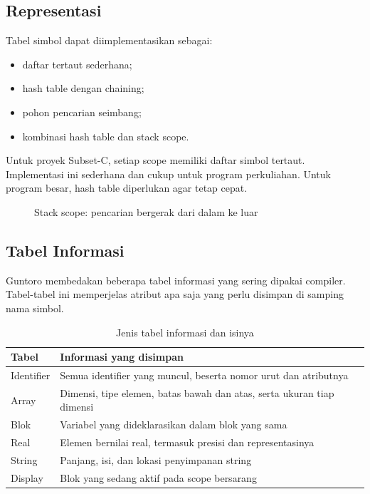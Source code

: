 \subsection{Representasi}

Tabel simbol dapat diimplementasikan sebagai:
\begin{itemize}[leftmargin=*]
  \item daftar tertaut sederhana;
  \item hash table dengan chaining;
  \item pohon pencarian seimbang;
  \item kombinasi hash table dan stack scope.
\end{itemize}

Untuk proyek Subset-C, setiap scope memiliki daftar simbol
tertaut. Implementasi ini sederhana dan cukup untuk program
perkuliahan. Untuk program besar, hash table diperlukan agar
 tetap cepat.

\begin{figure}[H]
\centering
{}
\caption{Stack scope: pencarian bergerak dari dalam ke luar}
\label{fig:ch15-scope-stack}
\end{figure}

\subsection{Tabel Informasi}

Guntoro membedakan beberapa tabel informasi yang sering dipakai
compiler. Tabel-tabel ini memperjelas atribut apa saja yang perlu
disimpan di samping nama simbol.

\begin{table}[H]
\centering
\caption{Jenis tabel informasi dan isinya}
\label{tab:ch15-informasi}
\begin{tabularx}{\textwidth}{@{}l X@{}}
\toprule
\textbf{Tabel} & \textbf{Informasi yang disimpan} \\
\midrule
Identifier & Semua identifier yang muncul, beserta nomor urut dan
atributnya \\
Array & Dimensi, tipe elemen, batas bawah dan atas, serta ukuran
tiap dimensi \\
Blok & Variabel yang dideklarasikan dalam blok yang sama \\
Real & Elemen bernilai real, termasuk presisi dan representasinya \\
String & Panjang, isi, dan lokasi penyimpanan string \\
Display & Blok yang sedang aktif pada scope bersarang \\
\bottomrule
\end{tabularx}
\end{table}

